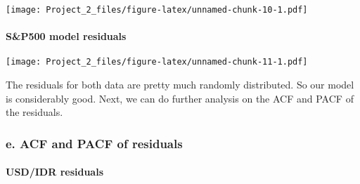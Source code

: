 \documentclass[]{article}
\newenvironment{Shaded}{\begin{snugshade}}{\end{snugshade}}
\newcommand{\KeywordTok}[1]{\textcolor[rgb]{0.13,0.29,0.53}{\textbf{#1}}}
\newcommand{\DataTypeTok}[1]{\textcolor[rgb]{0.13,0.29,0.53}{#1}}
\newcommand{\StringTok}[1]{\textcolor[rgb]{0.31,0.60,0.02}{#1}}
\newcommand{\OperatorTok}[1]{\textcolor[rgb]{0.81,0.36,0.00}{\textbf{#1}}}
\newcommand{\NormalTok}[1]{#1}
\let\oldparagraph\paragraph
\renewcommand{\paragraph}[1]{\oldparagraph{#1}\mbox{}}
\begin{document}
\begin{Shaded}
\end{Shaded}

\texttt{[image: Project\_2\_files/figure-latex/unnamed-chunk-10-1.pdf]}

\paragraph{S\&P500 model residuals}\label{sp500-model-residuals}

\begin{Shaded}
\end{Shaded}

\texttt{[image: Project\_2\_files/figure-latex/unnamed-chunk-11-1.pdf]}

The residuals for both data are pretty much randomly distributed. So our
model is considerably good. Next, we can do further analysis on the ACF
and PACF of the residuals.

\subsubsection{e. ACF and PACF of
residuals}\label{e.-acf-and-pacf-of-residuals}

\paragraph{USD/IDR residuals}\label{usdidr-residuals}
\end{document}
